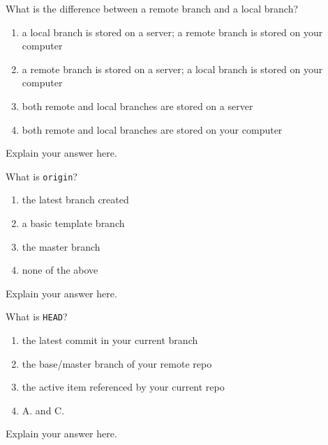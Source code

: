 \documentclass[12pt,fleqn]{examtst}
\begin{document}

\newpage
\noindent
\begin{minipage}{\textwidth}

What is the difference between a remote branch and a local branch?

\begin{enumerate}
    \item a local branch is stored on a server; a remote branch is stored on your computer
    \item a remote branch is stored on a server; a local branch is stored on your computer \marker
    \item both remote and local branches are stored on a server
    \item both remote and local branches are stored on your computer
\end{enumerate}
Explain your answer here.

What is \lstinline{origin}?

\begin{enumerate}
    \item the latest branch created
    \item a basic template branch
    \item the master branch \marker
    \item none of the above
\end{enumerate}
Explain your answer here.

What is \lstinline{HEAD}?

\begin{enumerate}
    \item the latest commit in your current branch
    \item the base/master branch of your remote repo
    \item the active item referenced by your current repo
    \item A. and C. \marker
\end{enumerate}
Explain your answer here.

\end{minipage}
\end{document}
